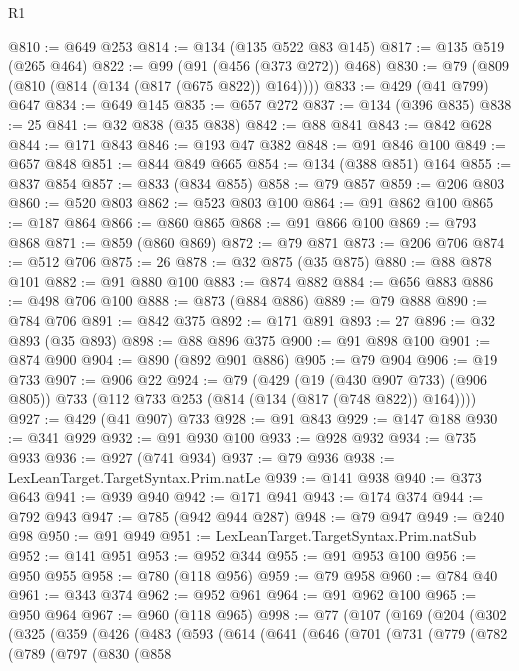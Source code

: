 \begin{lexlean}{R1}
\begin{coremodule}
{{{{{{{{{{{{{{{{{{{{{{{{{{{{{{{{{{{{{{{{{{{{{{{{{{{{{{{{{@810 := @649 @253
@814 := @134 (@135 @522 @83 @145)
@817 := @135 @519 (@265 @464)
@822 := @99 (@91 (@456 (@373 @272)) @468)
@830 := @79 (@809 (@810 (@814 (@134 (@817 (@675 @822)) @164))))
@833 := @429 (@41 @799) @647
@834 := @649 @145
@835 := @657 @272
@837 := @134 (@396 @835)
@838 := 25
@841 := @32 @838 (@35 @838)
@842 := @88 @841
@843 := @842 @628
@844 := @171 @843
@846 := @193 @47 @382
@848 := @91 @846 @100
@849 := @657 @848
@851 := @844 @849 @665
@854 := @134 (@388 @851) @164
@855 := @837 @854
@857 := @833 (@834 @855)
@858 := @79 @857
@859 := @206 @803
@860 := @520 @803
@862 := @523 @803 @100
@864 := @91 @862 @100
@865 := @187 @864
@866 := @860 @865
@868 := @91 @866 @100
@869 := @793 @868
@871 := @859 (@860 @869)
@872 := @79 @871
@873 := @206 @706
@874 := @512 @706
@875 := 26
@878 := @32 @875 (@35 @875)
@880 := @88 @878 @101
@882 := @91 @880 @100
@883 := @874 @882
@884 := @656 @883
@886 := @498 @706 @100
@888 := @873 (@884 @886)
@889 := @79 @888
@890 := @784 @706
@891 := @842 @375
@892 := @171 @891
@893 := 27
@896 := @32 @893 (@35 @893)
@898 := @88 @896 @375
@900 := @91 @898 @100
@901 := @874 @900
@904 := @890 (@892 @901 @886)
@905 := @79 @904
@906 := @19 @733
@907 := @906 @22
@924 := @79
    (@429
      (@19 (@430 @907 @733) (@906 @805))
      @733
      (@112 @733 @253 (@814 (@134 (@817 (@748 @822)) @164))))
@927 := @429 (@41 @907) @733
@928 := @91 @843
@929 := @147 @188
@930 := @341 @929
@932 := @91 @930 @100
@933 := @928 @932
@934 := @735 @933
@936 := @927 (@741 @934)
@937 := @79 @936
@938 := LexLeanTarget.TargetSyntax.Prim.natLe
@939 := @141 @938
@940 := @373 @643
@941 := @939 @940
@942 := @171 @941
@943 := @174 @374
@944 := @792 @943
@947 := @785 (@942 @944 @287)
@948 := @79 @947
@949 := @240 @98
@950 := @91 @949
@951 := LexLeanTarget.TargetSyntax.Prim.natSub
@952 := @141 @951
@953 := @952 @344
@955 := @91 @953 @100
@956 := @950 @955
@958 := @780 (@118 @956)
@959 := @79 @958
@960 := @784 @40
@961 := @343 @374
@962 := @952 @961
@964 := @91 @962 @100
@965 := @950 @964
@967 := @960 (@118 @965)
@998 := @77
    (@107
      (@169
        (@204
          (@302
            (@325
              (@359
                (@426
                  (@483
                    (@593
                      (@614
                        (@641
                          (@646
                            (@701
                              (@731
                                (@779
                                  (@782
                                    (@789
                                      (@797
                                        (@830
                                          (@858
}}}}}}}}}}}}}}}}}}}}}}}}}}}}}}}}}}}}}}}}}}}}}}}}}}}}}}}}}
\end{coremodule}
\end{lexlean}
